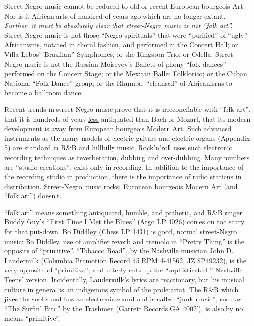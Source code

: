 Street-Negro music cannot be reduced to old or recent European bourgeois Art. 
Nor is it African arts of hundred of years ago which are no longer extant. 
\emph{Further, it must be absolutely clear that street-Negro music is not \enquote{folk art}.}
Street-Negro music is not those \enquote{Negro spirituals} that were \enquote{purified} of 
\enquote{ugly} Africanisms, notated in choral fashion, and performed in the Concert
Hall; or Villa-Lobos'\enquote{Brazilian} Symphonies; or the Kingston Trio; or Odella.
Street-Negro music is not the Russian Moiseyev's Ballets of phony \enquote{folk dances}
performed on the Concert Stage; or the Mexican Ballet Folklorico; or the Cuban
National \enquote{Folk Dance} group; or the Rhumba, \enquote{cleansed} of Africanisrns to become
a ballroom dance. 

Recent trends in street-Negro music prove that it is irreconcilable 
with \enquote{folk art}, that it is hundreds of years \uline{less} antiquated than Bach or 
Mozart, that its modern development is away from European bourgeois Modern 
Art. Such advanced instruments as the many models of electric guitars and 
electric organs (Appendix 5) are standard in R\&B and hillbilly music. Rock'n'roll 
uses such electronic recording techniques as reverberation, dubbing
and over-dubbing. Many numbers are \enquote{studio creations}, exist only in recording.
In addition to the importance of the recording studio in production, there 
is the importance of radio stations in distribution. Street-Negro music rocks;
European bourgeois Modern Art (and \enquote{folk art}) doesn't. 

\enquote{folk art} means something antiquated, humble, and pathetic, and R\&B singer
Buddy Guy's \enquote{First Time I Met the Blues} (Argo LP 4026) comes on too scary for
that put-down. \uline{Bo Diddley} (Chess LP 1431) is good, normal street-Negro music; 
Bo Diddley, use of amplifier reverb and tremolo in \enquote{Pretty Thing} is the 
opposite of \enquote{primitive}. \enquote{Tobacco Road}, by the Nashville musician John D. 
Laudermilk (Columbia Promotion Record 45 RPM 4-41562, JZ SP49232), is the very 
opposite of \enquote{primitive}; and utterly cuts up the \enquote{sophisticated } Nashville Teens'
version. Incidentally, Laudermilk's lyrics are reactionary, but his musical
culture in general is an indigenous symbol of the proletariat. The R\&R which 
jives the snobs and has an electronic sound and is called \enquote{junk music}, such
as \enquote{The Surfin' Bird} by the Trashmen (Garrett Records GA 4002'), is also
by no means \enquote{primitive}. 

